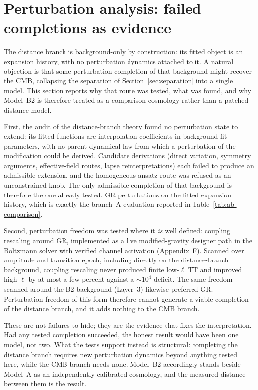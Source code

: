 \section{Perturbation analysis: failed completions as evidence}
\label{sec:perturbations}

The distance branch is background-only by construction: its fitted
object is an expansion history, with no perturbation dynamics attached
to it. A natural objection is that some perturbation completion of
that background might recover the CMB, collapsing the separation of
Section~\ref{sec:separation} into a single model. This section reports
why that route was tested, what was found, and why Model~B2 is
therefore treated as a comparison cosmology rather than a patched
distance model.

First, the audit of the distance-branch theory found no perturbation
state to extend: its fitted functions are interpolation coefficients
in background fit parameters, with no parent dynamical law from which
a perturbation of the modification could be derived. Candidate
derivations (direct variation, symmetry arguments, effective-field
routes, lapse reinterpretations) each failed to produce an admissible
extension, and the homogeneous-ansatz route was refused as an
unconstrained knob. The only admissible completion of that background
is therefore the one already tested: GR perturbations on the fitted
expansion history, which is exactly the branch~A evaluation reported
in Table~\ref{tab:ab-comparison}.

Second, perturbation freedom was tested where it \textit{is} well
defined: coupling rescaling around GR, implemented as a live modified-gravity
designer path in the Boltzmann solver with verified channel activation
(Appendix~F). Scanned over amplitude and transition epoch, including
directly on the distance-branch background, coupling rescaling never
produced finite low-$\ell$ TT and improved high-$\ell$ by at most a few
percent against a $\sim$$10^{4}$ deficit. The same freedom scanned
around the B2 background (Layer~3) likewise preferred GR. Perturbation
freedom of this form therefore cannot generate a viable completion of
the distance branch, and it adds nothing to the CMB branch.

These are not failures to hide; they are the evidence that fixes the
interpretation. Had any tested completion succeeded, the honest result
would have been one model, not two. What the tests support instead is
structural: completing the distance branch requires new perturbation
dynamics beyond anything tested here, while the CMB branch needs none.
Model~B2 accordingly stands beside Model~A as an independently
calibrated cosmology, and the measured distance between them is the
result.
